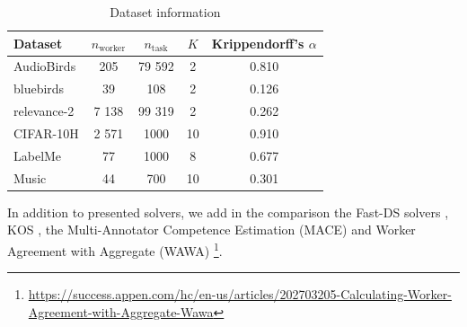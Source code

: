 \begin{table}[htbp]
    \centering
    \caption{Dataset information}
    \label{tab:benchopt_datasets}
    \begin{tabular}{lcccc}
        \toprule
        \textbf{Dataset} & $n_\text{worker}$ & $n_\text{task}$ &$K$ & Krippendorff's $\alpha$ \\
        \hline
        \hline
        AudioBirds \citep{lehikoinen2023successful} & 205 & 79 592 & 2 & 0.810 \\
        bluebirds \citep{WelinderEtal10b} & 39 & 108 & 2 & 0.126 \\
        relevance-2 & 7 138 & 99 319 & 2 & 0.262 \\
        CIFAR-10H \citep{peterson_human_2019} & 2 571 & 1000 & 10 & 0.910 \\
        LabelMe \citep{rodrigues2014gaussian} & 77 & 1000 & 8 & 0.677 \\
        Music \citep{rodrigues2017learning} & 44 & 700 & 10 & 0.301 \\
        \bottomrule
    \end{tabular}
\end{table}

In addition to presented solvers, we add in the comparison the Fast-DS solvers \citep{sinha2018fast}, KOS \citep{karger2011iterative}, the Multi-Annotator Competence Estimation (MACE) \citep{hovy2013learning} and Worker Agreement with Aggregate (WAWA) \footnote{\url{https://success.appen.com/hc/en-us/articles/202703205-Calculating-Worker-Agreement-with-Aggregate-Wawa}}.

